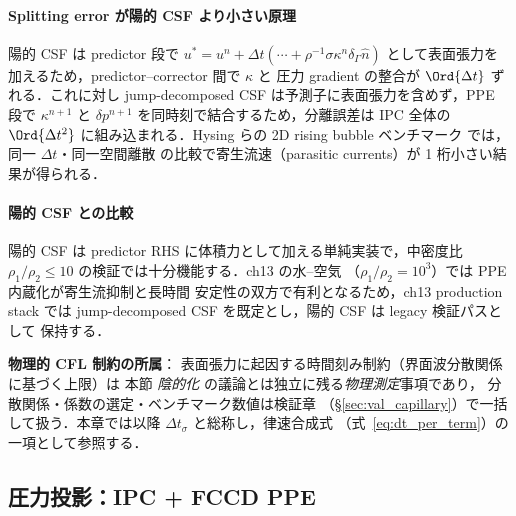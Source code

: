 \paragraph{Splitting error が陽的 CSF より小さい原理}
陽的 CSF は predictor 段で
$u^{*} = u^{n} + \Delta t(\cdots + \rho^{-1}\sigma\kappa^{n}\delta_\Gamma\hat{n})$
として表面張力を加えるため，predictor--corrector 間で $\kappa$ と
圧力 gradient の整合が $\Ord{\Delta t}$ ずれる．これに対し
jump-decomposed CSF は予測子に表面張力を含めず，PPE 段で $\kappa^{n+1}$
と $\delta p^{n+1}$ を同時刻で結合するため，分離誤差は IPC 全体の
$\Ord{\Delta t^2}$ に組み込まれる．Hysing らの 2D rising bubble
ベンチマーク \cite{Hysing2009} では，同一 $\Delta t$・同一空間離散
の比較で寄生流速（parasitic currents）が 1 桁小さい結果が得られる．

\paragraph{陽的 CSF との比較}
陽的 CSF は predictor RHS に体積力として加える単純実装で，中密度比
$\rho_1/\rho_2 \le 10$ の検証では十分機能する．ch13 の水--空気
（$\rho_1/\rho_2 = 10^3$）では PPE 内蔵化が寄生流抑制と長時間
安定性の双方で有利となるため，ch13 production stack では
jump-decomposed CSF を既定とし，陽的 CSF は legacy 検証パスとして
保持する．

\label{sec:time_capillary}%

\noindent\textbf{物理的 CFL 制約の所属}：
表面張力に起因する時間刻み制約（界面波分散関係に基づく上限）は
本節 \textit{陰的化} の議論とは独立に残る\emph{物理測定}事項であり，
分散関係・係数の選定・ベンチマーク数値は検証章
（§\ref{sec:val_capillary}）で一括して扱う．本章では以降
$\Delta t_\sigma$ と総称し，律速合成式
（式~\eqref{eq:dt_per_term}）の一項として参照する．

\subsection{圧力投影：IPC + FCCD PPE}%
\label{sec:ipc_derivation}

